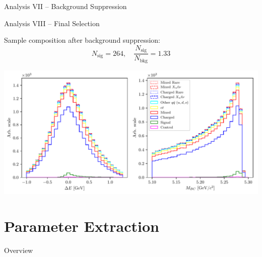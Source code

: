 \documentclass[serif]{beamer}
\begin{document}
\begin{frame}[t]{Analysis VII -- Background Suppression}
\end{frame}


\begin{frame}[t]{Analysis VIII -- Final Selection}
\vspace{-3mm}
\small

Sample composition after background suppression:
$$N_{\mathrm{sig}} = 264,\quad \frac{N_{\mathrm{sig}}}{N_{\mathrm{bkg}}} = 1.33$$

\begin{center}
	\includegraphics[width=\textwidth]{fig/opt_uBB_si}
\end{center}



\end{frame}




\section{Parameter Extraction} 

\begin{frame}[t]{Overview}
\end{frame}


\end{document}
